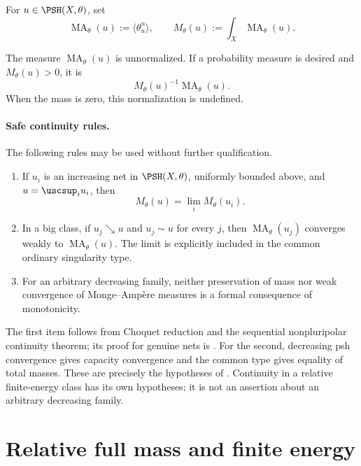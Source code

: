 \begin{definition}
\label{def:appH-ma-mass}
For \(u\in\PSH(X,\theta)\), set
\[
             \operatorname{MA}_\theta(u):=\langle\theta_u^n\rangle,
             \qquad
             M_\theta(u):=\int_X\operatorname{MA}_\theta(u).
\]
\end{definition}

The measure \(\operatorname{MA}_\theta(u)\) is unnormalized. If a
probability measure is desired and \(M_\theta(u)>0\), it is
\[
                         M_\theta(u)^{-1}
                         \operatorname{MA}_\theta(u).
\]
When the mass is zero, this normalization is undefined.

\paragraph{Safe continuity rules.}\label{prop:appH-safe-continuity}
The following rules may be used without further qualification.
\begin{enumerate}
\item If \(u_i\) is an increasing net in \(\PSH(X,\theta)\), uniformly
bounded above, and \(u=\uscsup_i u_i\), then
\[
                         M_\theta(u)=\lim_iM_\theta(u_i).
\]
\item In a big class, if \(u_j\searrow u\) and \(u_j\sim u\) for every
\(j\), then \(\operatorname{MA}_\theta(u_j)\) converges weakly to
\(\operatorname{MA}_\theta(u)\).  The limit is explicitly included in
the common ordinary singularity type.
\item For an arbitrary decreasing family, neither preservation of mass nor
weak convergence of Monge--Amp\`ere measures is a formal consequence of
monotonicity.
\end{enumerate}

The first item follows from Choquet reduction and the sequential
nonpluripolar continuity theorem; its proof for genuine nets is
.  For the second, decreasing psh
convergence gives capacity convergence and the common type gives equality
of total masses.  These are precisely the hypotheses of
\cite[Theorem~2.3]{DDNL18mono}.  Continuity in a relative finite-energy
class has its own hypotheses; it is not an assertion about an arbitrary
decreasing family.

\section{Relative full mass and finite energy}
\label{sec:appH-relative-energy}

